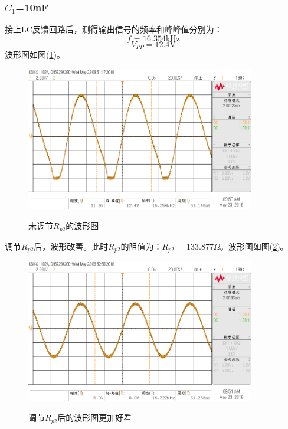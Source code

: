 \documentclass[a4paper]{article}
\begin{document}
\subsubsection{$C_1$=10nF}
接上LC反馈回路后，测得输出信号的频率和峰峰值分别为：
$$f\text{ = 16.354kHz}$$
$$V_{PP} = 12.4\text{V}$$
波形图如图(\ref{datafig1})。
\begin{figure}[!h]
\centering
\includegraphics[width=10cm]{fig/scope_1.png}\\
\caption{未调节$R_{p2}$的波形图}\label{datafig1}
\end{figure}

调节$R_{p2}$后，波形改善。此时$R_{p2}$的阻值为：$R_{p2}\text{ = 133.877}\Omega$。波形图如图(\ref{datafig2})。
\begin{figure}[!h]
\centering
\includegraphics[width=10cm]{fig/scope_2.png}\\
\caption{调节$R_{p2}$后的波形图更加好看}\label{datafig2}
\end{figure}
\end{document}

